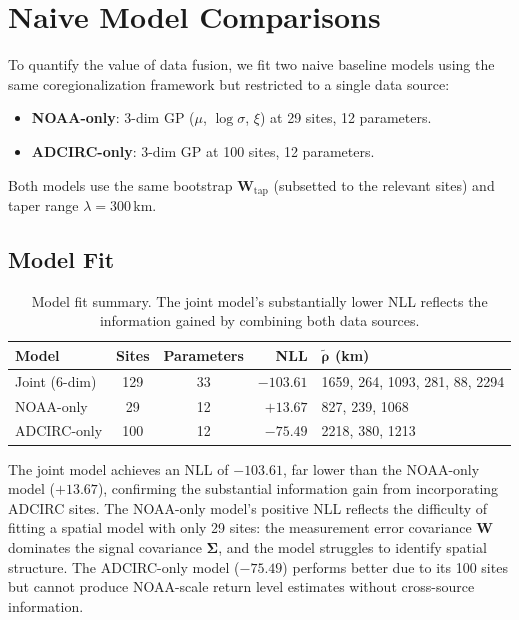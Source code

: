 \documentclass[11pt]{article}
\newcommand{\bW}{\mathbf{W}}
\newcommand{\bSigma}{\bm{\Sigma}}
\begin{document}
\section{Naive Model Comparisons}
\label{sec:naive}

To quantify the value of data fusion, we fit two naive baseline models using the same coregionalization framework but restricted to a single data source:
\begin{itemize}[nosep]
    \item \textbf{NOAA-only}: 3-dim GP ($\mu$, $\log\sigma$, $\xi$) at 29 sites, 12 parameters.
    \item \textbf{ADCIRC-only}: 3-dim GP at 100 sites, 12 parameters.
\end{itemize}
Both models use the same bootstrap $\bW_{\text{tap}}$ (subsetted to the relevant sites) and taper range $\lambda = 300$\,km.

\subsection{Model Fit}

\begin{table}[h]
\centering
\caption{Model fit summary. The joint model's substantially lower NLL reflects the information gained by combining both data sources.}
\label{tab:model_fit}
\begin{tabular}{@{}lccrl@{}}
\toprule
Model & Sites & Parameters & NLL & $\tilde{\bm{\rho}}$ (km) \\
\midrule
Joint (6-dim) & 129 & 33 & $-103.61$ & 1659, 264, 1093, 281, 88, 2294 \\
NOAA-only & 29 & 12 & $+13.67$ & 827, 239, 1068 \\
ADCIRC-only & 100 & 12 & $-75.49$ & 2218, 380, 1213 \\
\bottomrule
\end{tabular}
\end{table}

The joint model achieves an NLL of $-103.61$, far lower than the NOAA-only model ($+13.67$), confirming the substantial information gain from incorporating ADCIRC sites. The NOAA-only model's positive NLL reflects the difficulty of fitting a spatial model with only 29 sites: the measurement error covariance $\bW$ dominates the signal covariance $\bSigma$, and the model struggles to identify spatial structure. The ADCIRC-only model ($-75.49$) performs better due to its 100 sites but cannot produce NOAA-scale return level estimates without cross-source information.
\end{document}
